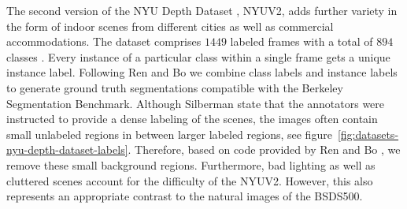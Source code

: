 The second version of the NYU Depth Dataset \cite{SilbermanHoiemKohliFergus:2012}, NYUV2, adds further variety in the form of indoor scenes from different cities as well as commercial accommodations. The dataset comprises $1449$ labeled frames with a total of $894$ classes \cite{SilbermanHoiemKohliFergus:2012}. Every instance of a particular class within a single frame gets a unique instance label. Following Ren and Bo \cite{RenBo:2012} we combine class labels and instance labels to generate ground truth segmentations compatible with the Berkeley Segmentation Benchmark. Although Silberman \etal state that the annotators were instructed to provide a dense labeling of the scenes, the images often contain small unlabeled regions in between larger labeled regions, see figure~\ref{fig:datasets-nyu-depth-dataset-labels}. Therefore, based on code provided by Ren and Bo \cite{RenBo:2012}, we remove these small background regions. Furthermore, bad lighting as well as cluttered scenes account for the difficulty of the NYUV2. However, this also represents an appropriate contrast to the natural images of the BSDS500.

